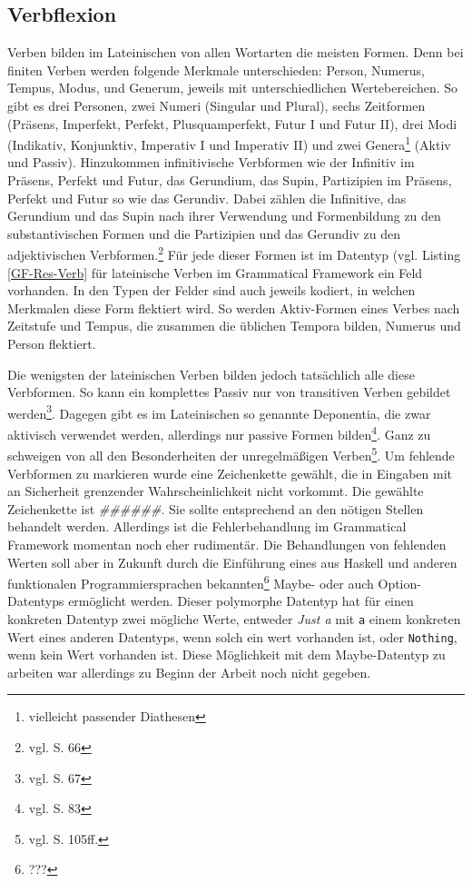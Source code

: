\subsection{Verbflexion}
\label{subsec:verb}
Verben bilden im Lateinischen von allen Wortarten die meisten Formen. Denn bei finiten Verben werden folgende Merkmale unterschieden: Person, Numerus, Tempus, Modus, und Generum, jeweils mit unterschiedlichen Wertebereichen. So gibt es drei Personen, zwei Numeri (Singular und Plural), sechs Zeitformen (Präsens, Imperfekt, Perfekt, Plusquamperfekt, Futur I und Futur II), drei Modi (Indikativ, Konjunktiv, Imperativ I und Imperativ II) und zwei Genera\footnote{vielleicht passender Diathesen} (Aktiv und Passiv). Hinzukommen infinitivische Verbformen wie der Infinitiv im Präsens, Perfekt und Futur, das Gerundium, das Supin, Partizipien im Präsens, Perfekt und Futur so wie das Gerundiv. Dabei zählen die Infinitive, das Gerundium und das Supin nach ihrer Verwendung und Formenbildung zu den substantivischen Formen und die Partizipien und das Gerundiv zu den adjektivischen Verbformen.\footnote{vgl. \cite{BAYER-LINDAUER1994} S. 66} Für jede dieser Formen ist im Datentyp (vgl. Listing \ref{GF-Res-Verb} für lateinische Verben im Grammatical Framework ein Feld vorhanden. In den Typen der Felder sind auch jeweils kodiert, in welchen Merkmalen diese Form flektiert wird. So werden Aktiv-Formen eines Verbes nach Zeitstufe und Tempus, die zusammen die üblichen Tempora bilden, Numerus und Person flektiert.  \par
Die wenigsten der lateinischen Verben bilden jedoch tatsächlich alle diese Verbformen. So kann ein komplettes Passiv nur von transitiven Verben gebildet werden\footnote{vgl. \cite{BAYER-LINDAUER1994} S. 67}. Dagegen gibt es im Lateinischen so genannte Deponentia, die zwar aktivisch verwendet werden, allerdings nur passive Formen bilden\footnote{vgl. \cite{BAYER-LINDAUER1994} S. 83}. Ganz zu schweigen von all den Besonderheiten der unregelmäßigen Verben\footnote{vgl. \cite{BAYER-LINDAUER1994} S. 105ff.}. Um fehlende Verbformen zu markieren wurde eine Zeichenkette gewählt, die in Eingaben mit an Sicherheit grenzender Wahrscheinlichkeit nicht vorkommt. Die gewählte Zeichenkette ist \textit{\#\#\#\#\#\#}. Sie sollte entsprechend an den nötigen Stellen behandelt werden. Allerdings ist die Fehlerbehandlung im Grammatical Framework momentan noch eher rudimentär. Die Behandlungen von fehlenden Werten soll aber in Zukunft durch die Einführung eines aus Haskell und anderen funktionalen Programmiersprachen bekannten\footnote{???} Maybe- oder auch Option-Datentyps ermöglicht werden. Dieser polymorphe Datentyp hat für einen konkreten Datentyp zwei mögliche Werte, entweder \textit{Just a} mit \texttt{a} einem konkreten Wert eines anderen Datentyps, wenn solch ein wert vorhanden ist, oder \texttt{Nothing}, wenn kein Wert vorhanden ist. Diese Möglichkeit mit dem Maybe-Datentyp zu arbeiten war allerdings zu Beginn der Arbeit noch nicht gegeben.\par
